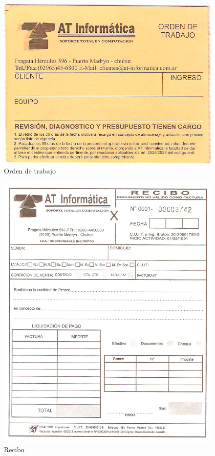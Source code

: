 \documentclass[12pt]{extarticle}
\begin{document}
	\begin{figure}[h]
	\includegraphics[scale=0.5]{images/atinformatica-orden_de_trabajo.jpg}
	\caption{Orden de trabajo}
	\end{figure}

	\begin{figure}[h]
	\includegraphics[scale=0.4]{images/atinformatica-recibo.jpg}
	\caption{Recibo}
	\end{figure}
\end{document}
